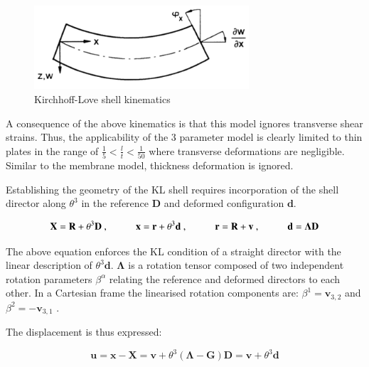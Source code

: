 \begin{figure}[H]
	\centering
	\def\svgwidth{\columnwidth}
	\includegraphics[width=8cm]{images/bernoullie.png}
	\caption{Kirchhoff-Love shell kinematics \cite{Bletz16}}
	\label{thinshellkine1}
\end{figure}

A consequence of the above kinematics is that this model ignores transverse shear strains. Thus, the applicability of the 3 parameter model is clearly limited to thin plates in the range of $\frac{1}{5} < \frac{l}{t} < \frac{1}{50}$ where transverse deformations are negligible. Similar to the membrane model, thickness deformation is ignored.

Establishing the geometry of the KL shell requires incorporation of the shell director along $\theta^3$ in the reference $\mathbf{D}$ and deformed configuration $\mathbf{d}$.

\begin{equation} 
\mathbf{X} = \mathbf{R} + \theta^3 \mathbf{D}\ ,
\hspace{10mm}
\mathbf{x} = \mathbf{r} + \theta^3 \mathbf{d}\ ,
\hspace{10mm}
\mathbf{r} = \mathbf{R} + \mathbf{v}\ ,
\hspace{10mm}
\mathbf{d} = \boldsymbol{\Lambda}  \mathbf{D}
\label{eqskt1}
\end{equation}

The above equation enforces the KL condition of a straight director with the linear description of $\theta^3 \mathbf{d}$. $\boldsymbol{\Lambda}$ is a rotation tensor composed of two independent rotation parameters $\beta^\alpha$ relating the reference and deformed directors to each other. In a Cartesian frame the linearised rotation components are: $\beta^1 = \mathbf{v}_{3,2}$ and $\beta^2 = -\mathbf{v}_{3,1}$ \cite{BischLitBook04}.

The displacement is thus expressed:

\begin{equation} 
\mathbf{u} = \mathbf{x} - \mathbf{X}
=
\mathbf{v} + \theta^3 (\boldsymbol{\Lambda} - \mathbf{G}) \mathbf{D}
=
\mathbf{v} + \theta^3 \mathbf{d}
\label{eqskt2}
\end{equation}

